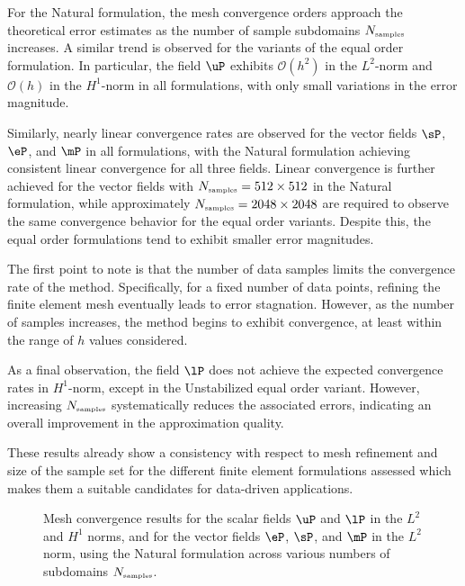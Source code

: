 For the Natural formulation, the mesh convergence orders approach the theoretical error estimates as the number of sample subdomains $N_{\mbox{\tiny samples}}$ increases. A similar trend is observed for the variants of the equal order formulation. In particular, the field $\uP$ exhibits $\mathcal{O}(h^{2}) $ in the $L^{2}$-norm and $ \mathcal{O}(h) $ in the $H^{1}$-norm in all formulations, with only small variations in the error magnitude.

Similarly, nearly linear convergence rates are observed for the vector fields $\sP$, $\eP$, and $\mP$ in all formulations, with the Natural formulation achieving consistent linear convergence for all three fields. Linear convergence is further achieved for the vector fields with $N_{\mbox{\tiny samples}} = 512 \times 512$ in the Natural formulation, while approximately $N_{\mbox{\tiny samples}}  = 2048 \times 2048$ are required to observe the same convergence behavior for the equal order variants. Despite this, the equal order formulations tend to exhibit smaller error magnitudes.

The first point to note is that the number of data samples limits the convergence rate of the method. Specifically, for a fixed number of data points, refining the finite element mesh eventually leads to error stagnation. However, as the number of samples increases, the method begins to exhibit convergence, at least within the range of $h$ values considered.

As a final observation, the field $\lP$ does not achieve the expected convergence rates in $ H^{1} $-norm, except in the Unstabilized equal order variant. However, increasing $N_{\mbox{\tiny samples}}$ systematically reduces the associated errors, indicating an overall improvement in the approximation quality.

These results already show a consistency with respect to mesh refinement and size of the sample set for the different finite element formulations assessed which makes them a suitable candidates for data-driven applications. 




\begin{figure}[h!]
	\centering
	\caption{Mesh convergence results for the scalar fields $\uP$ and $\lP$ in the $L^2$ and $H^1$ norms, and for the vector fields $\eP$, $\sP$, and $\mP$ in the $L^2$ norm, using the Natural
	 formulation across various numbers of subdomains $N_{\mbox{\tiny samples}}$.}
	\def\svgwidth{1.0\columnwidth}
	
	\label{fig:quadricula_convergence_natural_linear}
\end{figure}


